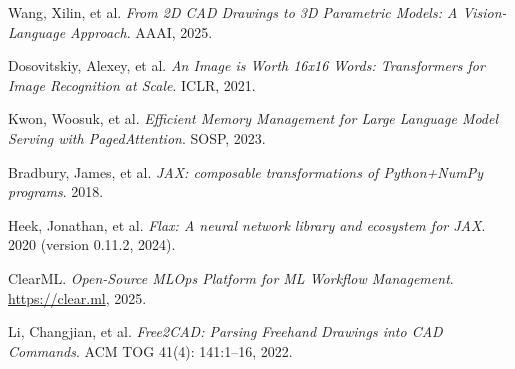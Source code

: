 \documentclass{article}
\begin{document}
\begin{thebibliography}{99}

 Wang, Xilin, et al. \textit{From 2D CAD Drawings to 3D Parametric Models: A Vision-Language Approach}. AAAI, 2025.

 Dosovitskiy, Alexey, et al. \textit{An Image is Worth 16x16 Words: Transformers for Image Recognition at Scale}. ICLR, 2021.

 Kwon, Woosuk, et al. \textit{Efficient Memory Management for Large Language Model Serving with PagedAttention}. SOSP, 2023.

 Bradbury, James, et al. \textit{JAX: composable transformations of Python+NumPy programs}. 2018.

 Heek, Jonathan, et al. \textit{Flax: A neural network library and ecosystem for JAX}. 2020 (version 0.11.2, 2024).

 ClearML. \textit{Open-Source MLOps Platform for ML Workflow Management}. \url{https://clear.ml}, 2025.

 Li, Changjian, et al. \textit{Free2CAD: Parsing Freehand Drawings into CAD Commands}. ACM TOG 41(4): 141:1–16, 2022.

\end{thebibliography}
\end{document}
